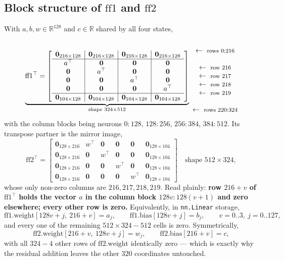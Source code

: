 \documentclass[11pt]{article}
\newcommand{\R}{\mathbb{R}}
\newcommand{\rowlab}[1]{\ \leftarrow\ \text{\footnotesize #1}}
\begin{document}
\subsection{Block structure of $\mathrm{ff1}$ and $\mathrm{ff2}$}
With $a,b,w\in\R^{128}$ and $c\in\R$ shared by all four states,
\begin{equation}
\underbrace{
\mathrm{ff1}^\top=
\left[
\begin{array}{c|c|c|c}
\bm{0}_{216\times128} & \bm{0}_{216\times128} & \bm{0}_{216\times128} & \bm{0}_{216\times128}\\
\hline
a^\top & \bm{0} & \bm{0} & \bm{0}\\
\bm{0} & a^\top & \bm{0} & \bm{0}\\
\bm{0} & \bm{0} & a^\top & \bm{0}\\
\bm{0} & \bm{0} & \bm{0} & a^\top\\
\hline
\bm{0}_{104\times128} & \bm{0}_{104\times128} & \bm{0}_{104\times128} & \bm{0}_{104\times128}
\end{array}
\right]}_{\text{shape }324\times512}
\begin{matrix}
\ \\
\rowlab{rows $0{:}216$}\\
\ \\
\rowlab{row $216$}\\
\rowlab{row $217$}\\
\rowlab{row $218$}\\
\rowlab{row $219$}\\
\ \\
\rowlab{rows $220{:}324$}
\end{matrix}
\end{equation}
with the column blocks being neurons $0{:}128$, $128{:}256$, $256{:}384$, $384{:}512$. Its
transpose partner is the mirror image,
\begin{equation}
\mathrm{ff2}^\top=
\left[
\begin{array}{c|cccc|c}
\bm{0}_{128\times216} & w^\top & \bm{0} & \bm{0} & \bm{0} & \bm{0}_{128\times104}\\
\bm{0}_{128\times216} & \bm{0} & w^\top & \bm{0} & \bm{0} & \bm{0}_{128\times104}\\
\bm{0}_{128\times216} & \bm{0} & \bm{0} & w^\top & \bm{0} & \bm{0}_{128\times104}\\
\bm{0}_{128\times216} & \bm{0} & \bm{0} & \bm{0} & w^\top & \bm{0}_{128\times104}
\end{array}
\right]
\quad\text{shape }512\times324 ,
\end{equation}
whose only non-zero columns are $216,217,218,219$.
Read plainly: \textbf{row $216+v$ of $\mathrm{ff1}^\top$ holds the vector $a$ in the column block
$128v:128(v+1)$ and zero elsewhere; every other row is zero.} Equivalently, in
\texttt{nn.Linear} storage,
\[
\mathrm{ff1.weight}[128v{+}j,\ 216{+}v]=a_j,\qquad
\mathrm{ff1.bias}[128v{+}j]=b_j,\qquad v=0..3,\ j=0..127,
\]
and every one of the remaining $512\times324-512$ cells is zero. Symmetrically,
\[
\mathrm{ff2.weight}[216{+}v,\ 128v{+}j]=w_j,\qquad
\mathrm{ff2.bias}[216{+}v]=c,
\]
with all $324-4$ other rows of $\mathrm{ff2.weight}$ identically zero --- which is exactly why the
residual addition leaves the other $320$ coordinates untouched.
\end{document}
